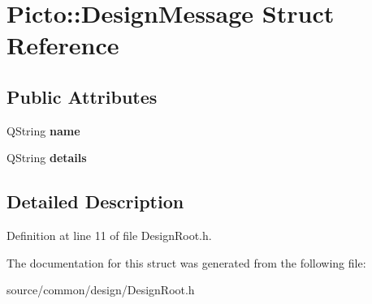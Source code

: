 \hypertarget{struct_picto_1_1_design_message}{\section{Picto\-:\-:Design\-Message Struct Reference}
\label{struct_picto_1_1_design_message}
}
\subsection*{Public Attributes}
\begin{DoxyCompactItemize}
\item 
\hypertarget{struct_picto_1_1_design_message_a7229d70119c9f33e25b2fbfbee6b67af}{Q\-String {\bfseries name}}\label{struct_picto_1_1_design_message_a7229d70119c9f33e25b2fbfbee6b67af}

\item 
\hypertarget{struct_picto_1_1_design_message_a002bd0da08b840d2145643212fd14ac8}{Q\-String {\bfseries details}}\label{struct_picto_1_1_design_message_a002bd0da08b840d2145643212fd14ac8}

\end{DoxyCompactItemize}


\subsection{Detailed Description}


Definition at line 11 of file Design\-Root.\-h.



The documentation for this struct was generated from the following file\-:\begin{DoxyCompactItemize}
\item 
source/common/design/Design\-Root.\-h\end{DoxyCompactItemize}
